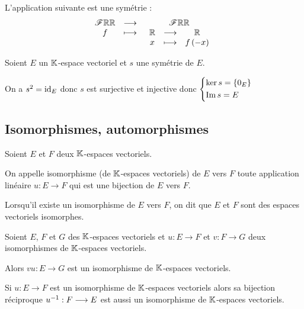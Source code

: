 \begin{ex}
L'application suivante est une symétrie : \[\begin{array}[t]{ccc}\mathscr{F}{\mathbb{R}}{\mathbb{R}} & \longrightarrow & \mathscr{F}{\mathbb{R}}{\mathbb{R}} \\ f & \longmapsto & \begin{array}[t]{ccc}\mathbb{R} & \longrightarrow & \mathbb{R} \\ x & \longmapsto & f\left(-x\right)\end{array}\end{array}\]
\end{ex}

\begin{rem}
Soient \(E\) un \(\mathbb{K}\)-espace vectoriel et \(s\) une symétrie de \(E\).

On a \(s^2=\mathrm{id}_{E}\) donc \(s\) est surjective et injective donc \(\begin{dcases}\ker s=\left\lbrace0_E\right\rbrace \\ \operatorname{Im} s=E\end{dcases}\)
\end{rem}

\subsection{Isomorphismes, automorphismes}

\begin{defi}[Isomorphisme]
Soient \(E\) et \(F\) deux \(\mathbb{K}\)-espaces vectoriels.

On appelle isomorphisme (de \(\mathbb{K}\)-espaces vectoriels) de \(E\) vers \(F\) toute application linéaire \(u:E\to F\) qui est une bijection de \(E\) vers \(F\).

Lorsqu'il existe un isomorphisme de \(E\) vers \(F\), on dit que \(E\) et \(F\) sont des espaces vectoriels isomorphes.
\end{defi}

\begin{prop}
Soient \(E\), \(F\) et \(G\) des \(\mathbb{K}\)-espaces vectoriels et \(u:E\to F\) et \(v:F\to G\) deux isomorphismes de \(\mathbb{K}\)-espaces vectoriels.

Alors \(vu:E\to G\) est un isomorphisme de \(\mathbb{K}\)-espaces vectoriels.
\end{prop}

\begin{dem}
\end{dem}

\begin{prop}
Si \(u:E\to F\) est un isomorphisme de \(\mathbb{K}\)-espaces vectoriels alors sa bijection réciproque \(u^{-1}:F\longrightarrow E\) est aussi un isomorphisme de \(\mathbb{K}\)-espaces vectoriels.
\end{prop}

